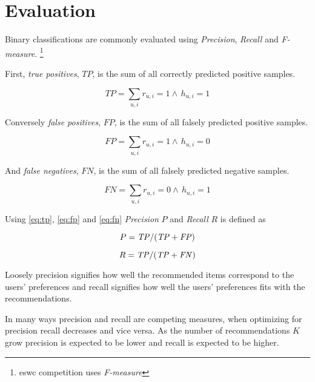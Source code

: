 
\newpage
\section{Evaluation}\label{sec:theory:eval}

Binary classifications are commonly evaluated using \textit{Precision}, \textit{Recall} and \textit{F-measure}.
\footnote{eswc competition uses \textit{F-measure}}

First, \textit{true positives}, $TP$, is the sum of all correctly predicted positive samples.

\begin{equation} \label{eq:tp}
    TP = \sum_{u, i} r_{u, i} = 1 \land \, h_{u, i} = 1
\end{equation}

Conversely \textit{false positives}, $FP$, is the sum of all falsely predicted positive samples.

\begin{equation} \label{eq:fp}
    FP = \sum_{u, i} r_{u, i} = 1 \land \, h_{u, i} = 0
\end{equation}

And \textit{false negatives}, $FN$, is the sum of all falsely predicted negative samples.

\begin{equation} \label{eq:fn}
    FN = \sum_{u, i} r_{u, i} = 0 \land \, h_{u, i} = 1
\end{equation}

Using \eqref{eq:tp}, \eqref{eq:fp} and \eqref{eq:fn} \textit{Precision} $P$ and \textit{Recall} $R$ is defined as

\begin{equation} \label{eq:precision}
    P = \mathit{TP} / (\mathit{TP} + \mathit{FP})
\end{equation}

\begin{equation} \label{eq:recall}
    R = \mathit{TP} / (\mathit{TP} + \mathit{FN})
\end{equation}

Loosely precision signifies how well the recommended items correspond to the users' preferences and recall signifies how well the users' preferences fits with the recommendations.  

In many ways precision and recall are competing measures, when optimizing for precision recall decreases and vice versa.  As the number of recommendations $K$ grow precision is expected to be lower and recall is expected to be higher. \citep{hu2008collaborative}


